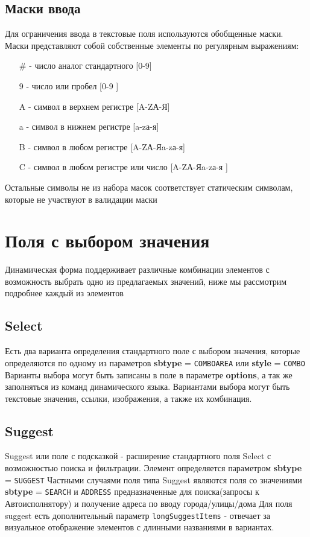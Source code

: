 \documentclass[../index.tex]{subfiles}
\begin{document}
    \subsection{Маски ввода}
        Для ограничения ввода в текстовые поля используются обобщенные маски. Маски представляют собой собственные элементы по регулярным выражениям:
        \begin{enumerate}
            \item[\#] - число аналог стандартного [0-9]
            \item[9] - число или пробел [0-9 ]
            \item[A] - символ в верхнем регистре [A-ZА-Я]
            \item[a] - символ в нижнем регистре [a-zа-я]
            \item[B] - символ в любом регистре [A-ZА-Яa-zа-я]
            \item[C] - символ в любом регистре или число [A-ZА-Яa-zа-я ]
        \end{enumerate}
        Остальные символы не из набора масок соответствует статическим символам, которые не участвуют в валидации маски
\section{Поля с выбором значения}
    Динамическая форма поддерживает различные комбинации элементов с возможность выбрать одно из предлагаемых значений, ниже мы рассмотрим подробнее каждый из элементов
\subsection{Select}
    Есть два варианта определения стандартного поле с выбором значения, которые определяются по одному из параметров \textbf{sbtype} = \verb|COMBOAREA| или \textbf{style} = \verb|COMBO|
    Варианты выбора могут быть записаны в поле в параметре \textbf{options}, а так же заполняться из команд динамического языка. Вариантами выбора могут быть текстовые значения, ссылки, изображения, а также их комбинация.
\subsection{Suggest}\label{suggest}
    Suggest или поле с подсказкой - расширение стандартного поля Select с возможностью поиска и фильтрации.
    Элемент определяется параметром \textbf{sbtype} = \verb|SUGGEST|
    Частными случаями поля типа Suggest являются поля со значениями \textbf{sbtype} = \verb|SEARCH| и \verb|ADDRESS| предназначенные для поиска(запросы к Автоисполнятору) и получение адреса по вводу города/улицы/дома
    Для поля suggest есть дополнительный параметр \verb|longSuggestItems| - отвечает за визуальное отображение элементов с длинными названиями в вариантах.
\end{document}
